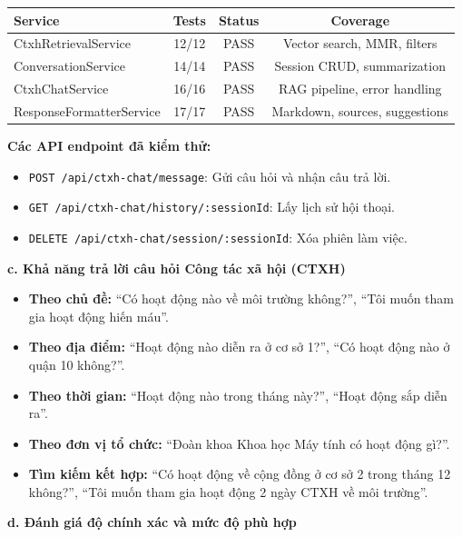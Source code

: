 \begin{table}[H]
\centering
\begin{tabular}{lccc}
\toprule
\textbf{Service} & \textbf{Tests} & \textbf{Status} & \textbf{Coverage} \\
\midrule
CtxhRetrievalService & 12/12 & PASS & Vector search, MMR, filters \\
ConversationService & 14/14 & PASS & Session CRUD, summarization \\
CtxhChatService & 16/16 &  PASS & RAG pipeline, error handling \\
ResponseFormatterService & 17/17 &  PASS & Markdown, sources, suggestions \\
\bottomrule
\end{tabular}
\end{table}

\textbf{Các API endpoint đã kiểm thử:}
\begin{itemize}
    \item \texttt{POST /api/ctxh-chat/message}: Gửi câu hỏi và nhận câu trả lời.
    \item \texttt{GET /api/ctxh-chat/history/:sessionId}: Lấy lịch sử hội thoại.
    \item \texttt{DELETE /api/ctxh-chat/session/:sessionId}: Xóa phiên làm việc.
\end{itemize}

\vspace{0.5em}
\textbf{c. Khả năng trả lời câu hỏi Công tác xã hội (CTXH)}
\begin{itemize}
    \item \textbf{Theo chủ đề:} ``Có hoạt động nào về môi trường không?'', ``Tôi muốn tham gia hoạt động hiến máu''.
    \item \textbf{Theo địa điểm:} ``Hoạt động nào diễn ra ở cơ sở 1?'', ``Có hoạt động nào ở quận 10 không?''.
    \item \textbf{Theo thời gian:} ``Hoạt động nào trong tháng này?'', ``Hoạt động sắp diễn ra''.
    \item \textbf{Theo đơn vị tổ chức:} ``Đoàn khoa Khoa học Máy tính có hoạt động gì?''.
    \item \textbf{Tìm kiếm kết hợp:} ``Có hoạt động về cộng đồng ở cơ sở 2 trong tháng 12 không?'', ``Tôi muốn tham gia hoạt động 2 ngày CTXH về môi trường''.
\end{itemize}

\vspace{0.5em}
\textbf{d. Đánh giá độ chính xác và mức độ phù hợp}

